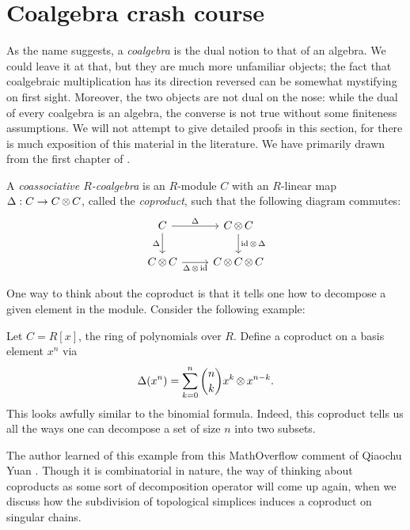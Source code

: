 \section{Coalgebra crash course}\label{chapter:coalgebras} \noindent As the name suggests, a \emph{coalgebra} is the dual notion to that of an algebra. We could leave it at that, but they are much more unfamiliar objects; the fact that coalgebraic multiplication has its direction reversed can be somewhat mystifying on first sight. Moreover, the two objects are not dual on the nose: while the dual of every coalgebra is an algebra, the converse is not true without some finiteness assumptions. We will not attempt to give detailed proofs in this section, for there is much exposition of this material in the literature. We have primarily drawn from the first chapter of \cite{Loday2012}.
\begin{defn}
    A \emph{coassociative $R$-coalgebra} is an $R$-module $C$ with an $R$-linear map $\Delta: C\to C\operatorname{\otimes} C$, called the \emph{coproduct}, such that the following diagram commutes:
\[\begin{tikzcd}
	C & {C\tensor C} \\
	{C\tensor C} & {C\tensor C\tensor C}
	\arrow["\Delta", from=1-1, to=1-2]
	\arrow["\Delta"', from=1-1, to=2-1]
	\arrow["{\id \tensor \Delta}", from=1-2, to=2-2]
	\arrow["{\Delta\tensor \id}"', from=2-1, to=2-2]
\end{tikzcd}\]
\end{defn}
One way to think about the coproduct is that it tells one how to decompose a given element in the module. Consider the following example:
\begin{exmp}
    Let $C= R[x]$, the ring of polynomials over $R$. Define a coproduct on a basis element $x^n$ via 
    \[\Delta(x^n) = \sum_{k=0}^n {\binom{n}{k}} x^k \operatorname{\otimes} x^{n-k}.\]
    This looks awfully similar to the binomial formula. Indeed, this coproduct tells us all the ways one can decompose a set of size $n$ into two subsets. 
\end{exmp}
The author learned of this example from this MathOverflow comment of Qiaochu Yuan \cite{Qiaochu_Coalgebra}. Though it is combinatorial in nature, the way of thinking about coproducts as some sort of decomposition operator will come up again, when we discuss how the subdivision of topological simplices induces a coproduct on singular chains.

